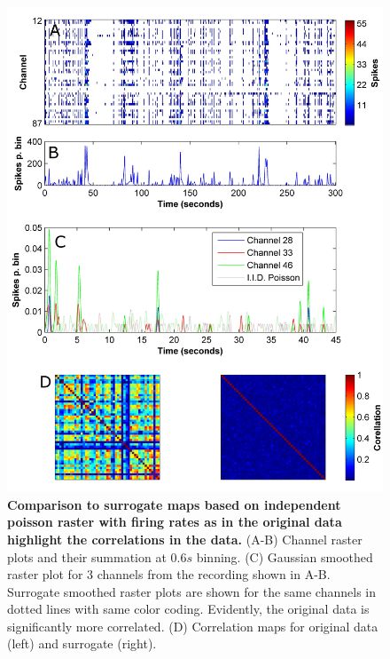 \label{sec:methods:corrMaps}
\begin{figure}[!htb]
    \centering
    \includegraphics[width=14cm]{chapter2/figures/corrIllustration/corrIllustration.jpg}
    \caption[Computation of correlation maps]{\textbf{Comparison to surrogate maps based on independent poisson raster with firing rates as in the original data highlight the correlations in the data.} (A-B) Channel raster plots and their summation at \(0.6s\) binning. (C) Gaussian smoothed raster plot for 3 channels from the recording shown in A-B. Surrogate smoothed raster plots are shown for the same channels in dotted lines with same color coding. Evidently, the original data is significantly more correlated. (D) Correlation maps for original data (left) and surrogate (right).}
    \label{fig:methods:corrIllustration}
\end{figure}

